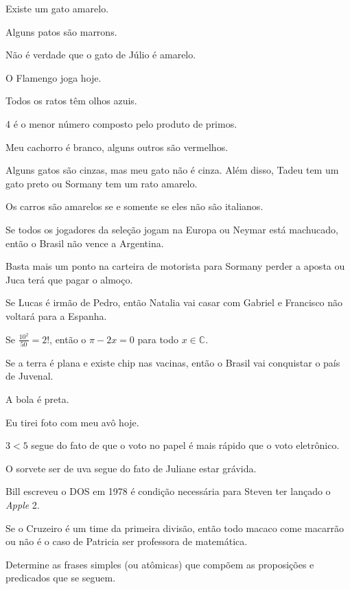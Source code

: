 \begin{exerList}
 \item Existe um gato amarelo.
 \item Alguns patos são marrons.
 \item Não é verdade que o gato de Júlio é amarelo.
 \item O Flamengo joga hoje.
 \item Todos os ratos têm olhos azuis.
 \item 4 é o menor número composto pelo produto de primos.
 \item Meu cachorro é branco, alguns outros são vermelhos.
 \item Alguns gatos são cinzas, mas meu gato não é cinza. Além disso, Tadeu tem um gato preto ou Sormany tem um rato amarelo.
 \item Os carros são amarelos se e somente se eles não são italianos.
 \item Se todos os jogadores da seleção jogam na Europa ou Neymar está machucado, então o Brasil não vence a Argentina.
 \item Basta mais um ponto na carteira de motorista para Sormany perder a aposta ou Juca terá que pagar o almoço.
 \item Se Lucas é irmão de Pedro, então Natalia vai casar com Gabriel e Francisco não voltará para a Espanha.
 \item Se $\frac{10^2}{50} = 2!$, então o $\pi - 2x = 0$ para todo $x \in \mathbb{C}$.
 \item Se a terra é plana e existe chip nas vacinas, então o Brasil vai conquistar o país de Juvenal.
 \item A bola é preta.
 \item Eu tirei foto com meu avô hoje.
 \item $3 < 5$ segue do fato de que o voto no papel é mais rápido que o voto eletrônico.
 \item O sorvete ser de uva segue do fato de Juliane estar grávida.
 \item Bill escreveu o DOS em 1978 é condição necessária para Steven ter lançado o \textit{Apple} 2.
 \item Se o Cruzeiro é um time da primeira divisão, então todo macaco come macarrão ou não é o caso de Patricia ser professora de matemática.
\end{exerList}

\begin{questao}
 Determine as frases simples (ou atômicas) que compõem as proposições e predicados que se seguem.
\end{questao}

